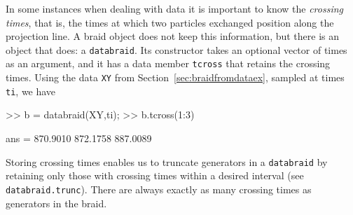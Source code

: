 \documentclass[12pt]{article}
\begin{document}
In some instances when dealing with data it is important to know the
\emph{crossing times}, %
%
that is, the times at which two particles exchanged position along the
projection line. %
%
A braid object does not keep this information, but there is an object that
does: a \lstinline{databraid}. %
%
Its constructor takes an optional vector of times as an argument, and it has a
data member \lstinline{tcross} %
%
that retains the crossing times.  Using the data \lstinline{XY} from Section~\ref{sec:braidfromdataex}, sampled at times \lstinline{ti}, we have
\begin{lstbraidlab}
>> b = databraid(XY,ti);
>> b.tcross(1:3)

ans = 870.9010  872.1758  887.0089
\end{lstbraidlab}
%
Storing crossing times enables us to truncate generators in a
\lstinline{databraid} by retaining only those with crossing times within a
desired interval (see \lstinline{databraid.trunc}). There are always exactly
as many crossing times as generators in the braid. %
%
%
\end{document}
